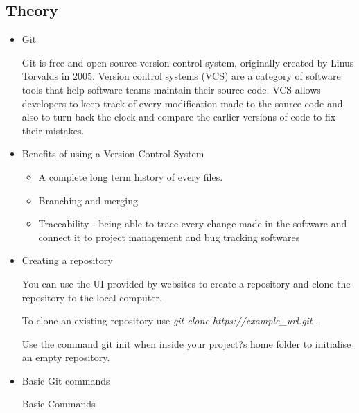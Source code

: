 \documentclass{article}
\begin{document}
\subsection{Theory}
\begin{itemize}
\item Git

Git is free and open source version control system, originally created by Linus Torvalds in 2005. Version control systems (VCS) are a category of software tools that help software teams maintain their source code. VCS allows developers to keep track of every modification made to the source code and also to turn back the clock and compare the earlier versions of code to fix their mistakes.

\item Benefits of using a Version Control System
\begin{itemize}
\item A complete long term history of every files.
\item Branching and merging
\item Traceability - being able to trace every change made in the software and connect it to project management and bug tracking softwares
\end{itemize}

\item Creating a repository

You can use the UI provided by websites to create a repository and clone the repository to the local computer. 

To clone an existing repository use \textit{git clone https://example\_url.git} .

Use the command git init when inside your project?s home folder to initialise an empty repository.

\item Basic Git commands
\begin{table}[htb]
\caption{Basic Commands}


\end{table}
\end{itemize}
\end{document}
